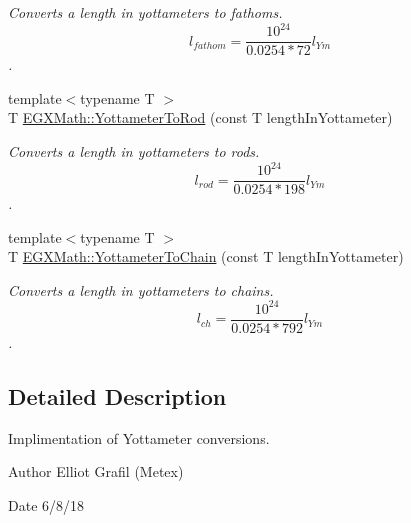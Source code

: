 \begin{DoxyCompactItemize}
\begin{DoxyCompactList}\small\item\em Converts a length in yottameters to fathoms. \[ l_{fathom}= \frac{10^{24}}{0.0254 * 72} l_{Ym} \]. \end{DoxyCompactList}\item 
{\footnotesize template$<$typename T $>$ }\\T \mbox{\hyperlink{group___e_g_x_math-_conversions-_length_conversions-_s_i-_yottameter-_surveyors_ga877c3000c23a08dc1bcd3c4359482356}{E\+G\+X\+Math\+::\+Yottameter\+To\+Rod}} (const T length\+In\+Yottameter)
\begin{DoxyCompactList}\small\item\em Converts a length in yottameters to rods. \[ l_{rod}= \frac{10^{24}}{0.0254 * 198} l_{Ym} \]. \end{DoxyCompactList}\item 
{\footnotesize template$<$typename T $>$ }\\T \mbox{\hyperlink{group___e_g_x_math-_conversions-_length_conversions-_s_i-_yottameter-_surveyors_gaac21de73406e1f0b39f48edd2bed4e4f}{E\+G\+X\+Math\+::\+Yottameter\+To\+Chain}} (const T length\+In\+Yottameter)
\begin{DoxyCompactList}\small\item\em Converts a length in yottameters to chains. \[ l_{ch}= \frac{10^{24}}{0.0254 * 792} l_{Ym} \]. \end{DoxyCompactList}\end{DoxyCompactItemize}


\subsection{Detailed Description}
Implimentation of Yottameter conversions. 

\begin{DoxyAuthor}{Author}
Elliot Grafil (Metex) 
\end{DoxyAuthor}
\begin{DoxyDate}{Date}
6/8/18 
\end{DoxyDate}
